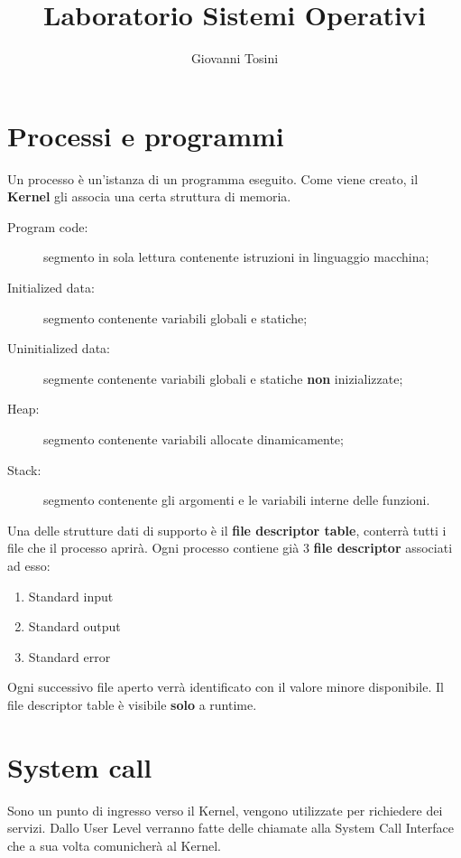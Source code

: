 \documentclass[a4paper, 12pt]{book}
\title{Laboratorio Sistemi Operativi}
\author{Giovanni Tosini}
\date{}
\begin{document}
    \begin{titlepage}
        \maketitle
    \end{titlepage}

    \frontmatter
    \tableofcontents
    \mainmatter

    \chapter{Processi e programmi}

    Un processo è un'istanza di un programma eseguito.
    Come viene creato, il \textbf{Kernel} gli associa
    una certa struttura di memoria.
    \begin{description}
        \item[Program code:] segmento in sola lettura  contenente istruzioni in linguaggio macchina;
        \item[Initialized data:] segmento contenente variabili globali e statiche;
        \item[Uninitialized data:] segmente contenente variabili globali e statiche \textbf{non} inizializzate;
        \item[Heap:] segmento contenente variabili allocate dinamicamente;
        \item[Stack:] segmento contenente gli argomenti e le variabili interne delle funzioni.    
    \end{description}
    Una delle strutture dati di supporto è il \textbf{file
    descriptor table}, conterrà tutti i file che il 
    processo aprirà. Ogni processo contiene già 3 
    \textbf{file descriptor} associati ad esso:
    \begin{enumerate}
        \item Standard input
        \item Standard output
        \item Standard error
    \end{enumerate}
    Ogni successivo file aperto verrà identificato con 
    il valore minore disponibile. Il file descriptor
    table è visibile \textbf{solo} a runtime.

    \chapter{System call}

    Sono un punto di ingresso verso il Kernel, vengono 
    utilizzate per richiedere dei servizi. Dallo User Level 
    verranno fatte delle chiamate alla System Call 
    Interface che a sua volta comunicherà al Kernel.
\end{document}
